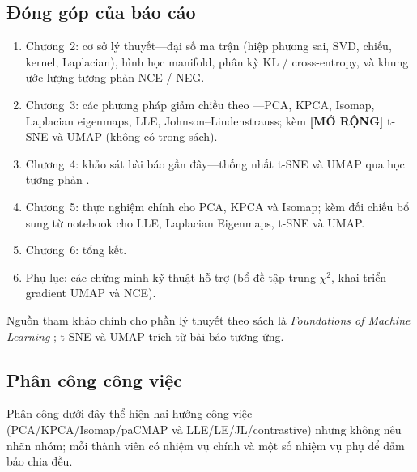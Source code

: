 \subsection{Đóng góp của báo cáo}

\begin{enumerate}
  \item Chương~2: cơ sở lý thuyết---đại số ma trận (hiệp phương sai, SVD, chiếu, kernel, Laplacian), hình học manifold, phân kỳ KL / cross-entropy, và khung ước lượng tương phản NCE / NEG.
  \item Chương~3: các phương pháp giảm chiều theo \cite{mohri2018foundations}---PCA, KPCA, Isomap, Laplacian eigenmaps, LLE, Johnson--Lindenstrauss; kèm \textbf{[MỞ RỘNG]} t-SNE và UMAP \cite{vandermaaten2008tsne,mcinnes2018umap} (không có trong sách).
  \item Chương~4: khảo sát bài báo gần đây---thống nhất t-SNE và UMAP qua học tương phản \cite{damrich2023contrastive}.
  \item Chương~5: thực nghiệm chính cho PCA, KPCA và Isomap; kèm đối chiếu bổ sung từ notebook cho LLE, Laplacian Eigenmaps, t-SNE và UMAP.
  \item Chương~6: tổng kết.
  \item Phụ lục: các chứng minh kỹ thuật hỗ trợ (bổ đề tập trung $\chi^2$, khai triển gradient UMAP và NCE).
\end{enumerate}

Nguồn tham khảo chính cho phần lý thuyết theo sách là \emph{Foundations of Machine Learning} \cite{mohri2018foundations}; t-SNE và UMAP trích từ bài báo tương ứng.

\subsection{Phân công công việc}

Phân công dưới đây thể hiện hai hướng công việc (PCA/KPCA/Isomap/paCMAP và LLE/LE/JL/contrastive) nhưng không nêu nhãn nhóm; mỗi thành viên có nhiệm vụ chính và một số nhiệm vụ phụ để đảm bảo chia đều.

